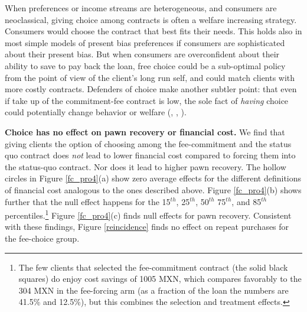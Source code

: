 \documentclass[oneside,11pt]{article}
\begin{document}
When preferences or income streams are heterogeneous, and consumers are neoclassical, giving choice among contracts is often a welfare increasing strategy. Consumers would choose the contract that best fits their needs. This holds also in most simple models of present bias preferences if consumers are sophisticated about their present bias. %
But when consumers are overconfident about their ability to save to pay back the loan, free choice could be a sub-optimal policy from the point of view of the client's long run self, and could match clients with  more costly contracts. Defenders of choice make another subtler point: that even if take up of the commitment-fee contract is low, the sole fact of \textit{having} choice could potentially change behavior or welfare (\cite{Dalboetal:2010}, \cite{Sjostrometal:2018}, \cite{Tlaxcala}). 

\vspace{.2in}
\noindent \textbf{Choice has no effect on pawn recovery or financial cost.} We find that giving clients the option of choosing among the fee-commitment and the status quo contract does \textit{not} lead to lower financial cost compared to forcing them into the status-quo contract. Nor does it lead to higher pawn recovery. The hollow circles in Figure \ref{fc_pro4}(a) show zero average effects for the different definitions of financial cost analogous to the ones described above. Figure \ref{fc_pro4}(b) shows further that the null effect happens for the 15$^{th}$, 25$^{th}$, 50$^{th}$ 75$^{th}$, and 85$^{th}$ percentiles.\footnote{The few clients that selected the fee-commitment contract (the solid black squares) do enjoy cost savings of 1005 MXN, which compares favorably to the 304 MXN in the fee-forcing arm (as a fraction of the loan the numbers are 41.5\% and 12.5\%), but this combines the selection and treatment effects.} %
Figure \ref{fc_pro4}(c) finds null effects for pawn recovery. Consistent with these findings, Figure \ref{reincidence} finds no effect on repeat purchases for the fee-choice group. 
\end{document}
